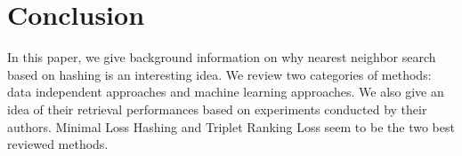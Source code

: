 \section{Conclusion}
In this paper, we give background information on why nearest neighbor search based on hashing is an interesting idea. We review two categories of methods: data independent approaches and machine learning approaches. We also give an idea of their retrieval performances based on experiments conducted by their authors. Minimal Loss Hashing and Triplet Ranking Loss seem to be the two best reviewed methods.